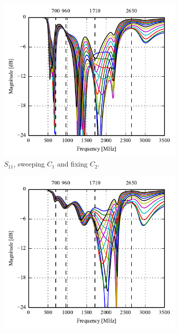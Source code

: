 \begin{figure}[htbp]
   \begin{subfigure}[b]{0.49\linewidth}
        \centering
        \includegraphics{img/tech_sol/monopole/talk_mode/s11}
        \caption{$S_{11}$, sweeping $C_1$ and fixing $C_2$.}
    \end{subfigure}
    \hfill
    \begin{subfigure}[b]{0.49\linewidth}
        \centering
        \includegraphics{img/tech_sol/monopole/talk_mode/s22}

\end{subfigure}
\end{figure}
